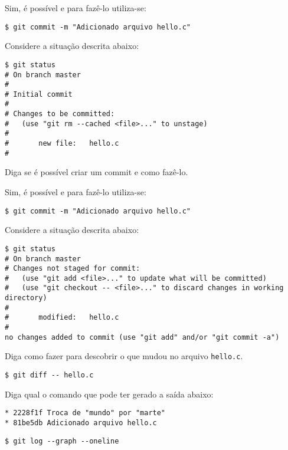 \begin{Answer}[ref={0010}]
  Sim, é possível e para fazê-lo utiliza-se:
  \begin{lstlisting}
$ git commit -m "Adicionado arquivo hello.c"
  \end{lstlisting}
\end{Answer}
\begin{Exercise}[label={0011}, difficulty={1}, origin={git}]
  Considere a situação descrita abaixo:
  \begin{lstlisting}
$ git status
# On branch master
#
# Initial commit
#
# Changes to be committed:
#   (use "git rm --cached <file>..." to unstage)
#
#       new file:   hello.c
#
  \end{lstlisting}
  Diga se é possível criar um commit e como fazê-lo.
\end{Exercise}

\begin{Answer}[ref={0011}]
  Sim, é possível e para fazê-lo utiliza-se:
  \begin{lstlisting}
$ git commit -m "Adicionado arquivo hello.c"
  \end{lstlisting}
\end{Answer}
\begin{Exercise}[label={0012}, difficulty={1}, origin={git}]
  Considere a situação descrita abaixo:
  \begin{lstlisting}
$ git status
# On branch master
# Changes not staged for commit:
#   (use "git add <file>..." to update what will be committed)
#   (use "git checkout -- <file>..." to discard changes in working directory)
#
#       modified:   hello.c
#
no changes added to commit (use "git add" and/or "git commit -a")
  \end{lstlisting}
  Diga como fazer para descobrir o que mudou no arquivo \lstinline+hello.c+.
\end{Exercise}

\begin{Answer}[ref={0012}]
  \begin{lstlisting}
$ git diff -- hello.c
  \end{lstlisting}
\end{Answer}
\begin{Exercise}[label={0013}, difficulty={1}, origin={git}]
  Diga qual o comando que pode ter gerado a saída abaixo:
  \begin{lstlisting}
* 2228f1f Troca de "mundo" por "marte"
* 81be5db Adicionado arquivo hello.c
  \end{lstlisting}
\end{Exercise}

\begin{Answer}[ref={0013}]
  \begin{lstlisting}
$ git log --graph --oneline
  \end{lstlisting}
\end{Answer}
